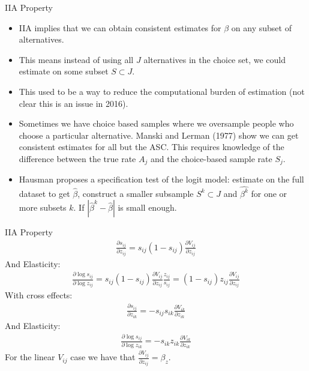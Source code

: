 \documentclass[xcolor=pdftex,dvipsnames,table,mathserif]{beamer}
\begin{document}
\begin{frame}{IIA Property}
\begin{itemize}
\item IIA implies that we can obtain consistent estimates for $\beta$ on any subset of alternatives.
\item This means instead of using all $J$ alternatives in the choice set, we could estimate on some subset $S \subset J$.
\item This used to be a way to reduce the computational burden of estimation (not clear this is an issue in 2016).
\item Sometimes we have \alert{choice based samples} where we oversample people who choose a particular alternative. Manski and Lerman (1977) show we can get consistent estimates for all but the ASC. This requires knowledge of the difference between the true rate $A_j$ and the choice-based sample rate $S_j$.
\item Hausman proposes a specification test of the logit model: estimate on the full dataset to get $\hat{\beta}$, construct a smaller subsample $S^k \subset J$ and $\hat{\beta^k}$ for one or more subsets $k$. If $|\hat{\beta}^k - \hat{\beta}|$ is small enough.
\end{itemize}
\end{frame}

\begin{frame}{IIA Property}
\begin{eqnarray*}
\frac{\partial s_{ij}}{\partial z_{ij}} = s_{ij}(1- s_{ij}) \frac{\partial V_{ij}}{\partial z_{ij}}
\end{eqnarray*}
And Elasticity:
\begin{eqnarray*}
\frac{ \partial \log s_{ij}}{ \partial \log z_{ij}} = s_{ij}(1- s_{ij}) \frac{\partial V_{ij}}{\partial z_{ij}} \frac{z_{ij}}{s_{ij}} = (1- s_{ij}) z_{ij} \frac{\partial V_{ij}}{\partial z_{ij}}
\end{eqnarray*}
With cross effects:
\begin{eqnarray*}
\frac{\partial s_{ij}}{\partial z_{ik}} = -s_{ij} s_{ik} \frac{\partial V_{ik}}{\partial z_{ik}}
\end{eqnarray*}
And Elasticity:
\begin{eqnarray*}
\frac{ \partial \log s_{ij}}{ \partial \log z_{ik}} = -s_{ik} z_{ik} \frac{\partial V_{ik}}{\partial z_{ik}}
\end{eqnarray*}
For the linear $V_{ij}$ case we have that $\frac{\partial V_{ij}}{\partial z_{ij}}=  \beta_z$.
\end{frame}
\end{document}
